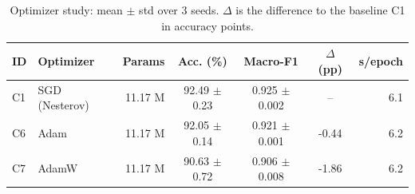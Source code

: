 \begin{table}[t]
\caption{Optimizer study: mean $\pm$ std over 3 seeds. $\Delta$ is the difference to the baseline C1 in accuracy points.}
\label{tab:optimizer}
\begin{tabular}{llrcccr}
\toprule
ID & Optimizer & Params & Acc. (\%) & Macro-F1 & $\Delta$ (pp) & s/epoch \\
\midrule
C1 & SGD (Nesterov) & 11.17 M & 92.49 $\pm$ 0.23 & 0.925 $\pm$ 0.002 & -- & 6.1 \\
C6 & Adam & 11.17 M & 92.05 $\pm$ 0.14 & 0.921 $\pm$ 0.001 & -0.44 & 6.2 \\
C7 & AdamW & 11.17 M & 90.63 $\pm$ 0.72 & 0.906 $\pm$ 0.008 & -1.86 & 6.2 \\
\bottomrule
\end{tabular}
\end{table}

